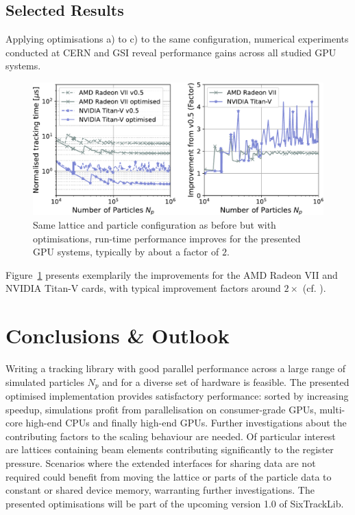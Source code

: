 \documentclass[a4paper,
               refpage,       %
               keeplastbox,   %
               ]{jacow}
\begin{document}
\subsection{Selected Results}
Applying optimisations a) to c) to the same configuration, numerical experiments conducted at CERN and GSI reveal performance gains across all studied GPU systems.
\begin{figure}[h!bt]
    \centering 
    \includegraphics*[width=\columnwidth]{fig_performance_optimisation}
    \caption{Same lattice and particle configuration as before but with optimisations, run-time performance improves for the presented GPU systems, typically by about a factor of $2$.}
    \label{fig:optimised_performance}
\end{figure}
Figure~\ref{fig:optimised_performance} presents exemplarily the improvements for the AMD Radeon VII and NVIDIA Titan-V cards, with typical improvement factors around $2\times$ (cf. \cite{data-2021}).

\section{Conclusions \& Outlook}
Writing a tracking library with good parallel performance across a large range of simulated particles $N_{p}$ and for a diverse set of hardware is feasible. The presented optimised implementation provides satisfactory performance:
sorted by increasing speedup, simulations profit from parallelisation on consumer-grade GPUs, multi-core high-end CPUs and finally high-end GPUs. 
Further investigations about the contributing factors to the scaling behaviour are needed. Of particular interest are lattices containing beam elements contributing significantly to the register pressure. Scenarios where the extended interfaces for sharing data are not required could benefit from moving the lattice or parts of the particle data to constant or shared device memory, warranting further investigations. The presented optimisations will be part of the upcoming version 1.0 of SixTrackLib.
\end{document}
